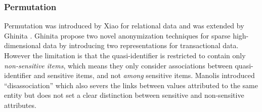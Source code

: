 \subsubsection{Permutation}

Permutation was introduced by Xiao \etal \cite{Xiao:2006:Anatomy} for
relational data and was extended by
Ghinita \etal \cite{2011:TKDE:Anonymous}.
Ghinita \etal propose two novel anonymization techniques for sparse
high-dimensional data by introducing two representations for transactional
data. However the limitation is that the quasi-identifier is restricted to
contain only {\em non-sensitive items}, which means they only
consider associations between quasi-identifier
and sensitive items, and not {\em among} sensitive items.
Manolis \etal \cite{terrovitis:privacy} introduced ``disassociation''
which also severs the links between values attributed to the
same entity but does not
set a clear distinction between sensitive and non-sensitive attributes.
%

